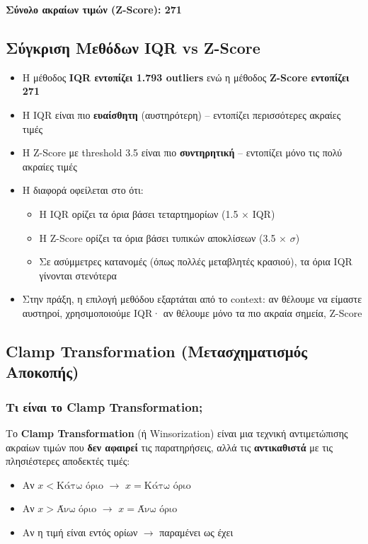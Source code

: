\documentclass[12pt,a4paper]{article}
\begin{document}
\textbf{Σύνολο ακραίων τιμών (Z-Score): 271}

\subsection{Σύγκριση Μεθόδων IQR vs Z-Score}

\begin{itemize}
    \item Η μέθοδος \textbf{IQR εντοπίζει 1.793 outliers} ενώ η μέθοδος \textbf{Z-Score εντοπίζει 271}
    \item Η IQR είναι πιο \textbf{ευαίσθητη} (αυστηρότερη) -- εντοπίζει περισσότερες ακραίες τιμές
    \item Η Z-Score με threshold 3.5 είναι πιο \textbf{συντηρητική} -- εντοπίζει μόνο τις πολύ ακραίες τιμές
    \item Η διαφορά οφείλεται στο ότι:
    \begin{itemize}
        \item Η IQR ορίζει τα όρια βάσει τεταρτημορίων (1.5 $\times$ IQR)
        \item Η Z-Score ορίζει τα όρια βάσει τυπικών αποκλίσεων (3.5 $\times$ $\sigma$)
        \item Σε ασύμμετρες κατανομές (όπως πολλές μεταβλητές κρασιού), τα όρια IQR γίνονται στενότερα
    \end{itemize}
    \item Στην πράξη, η επιλογή μεθόδου εξαρτάται από το context: αν θέλουμε να είμαστε αυστηροί, χρησιμοποιούμε IQR· αν θέλουμε μόνο τα πιο ακραία σημεία, Z-Score
\end{itemize}

\subsection{Clamp Transformation (Μετασχηματισμός Αποκοπής)}

\subsubsection{Τι είναι το Clamp Transformation;}

Το \textbf{Clamp Transformation} (ή Winsorization) είναι μια τεχνική αντιμετώπισης ακραίων τιμών που \textbf{δεν αφαιρεί} τις παρατηρήσεις, αλλά τις \textbf{αντικαθιστά} με τις πλησιέστερες αποδεκτές τιμές:

\begin{itemize}
    \item Αν $x < \text{Κάτω όριο}$ $\rightarrow$ $x = \text{Κάτω όριο}$
    \item Αν $x > \text{Άνω όριο}$ $\rightarrow$ $x = \text{Άνω όριο}$
    \item Αν η τιμή είναι εντός ορίων $\rightarrow$ παραμένει ως έχει
\end{itemize}
\end{document}
